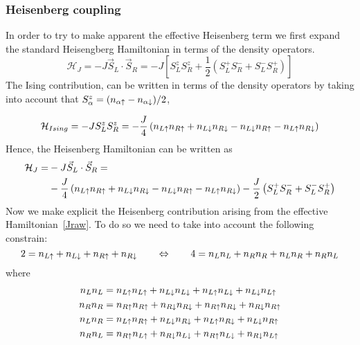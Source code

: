 \subsubsection{Heisenberg coupling}
In order to try to make apparent the effective Heisenberg term we first expand the standard Heisengberg Hamiltonian in terms of the density operators.
\begin{equation}
  \mathcal{H}_J = -J\vec{S}_L\cdot\vec{S}_R =
  -J \left[S^z_LS^z_R+\frac{1}{2}\left(S^+_LS^-_R+S^-_LS^+_R\right)\right]
\end{equation}
The Ising contribution, can be written in terms of the density operators by taking into account that $S^z_\alpha = (n_{\alpha\uparrow}-n_{\alpha\downarrow})/2$,

\begin{equation}
  \mathcal{H}_{Ising} = -J S^z_LS^z_R = -\frac{J}{4}
      \left(n_{L\uparrow}n_{R\uparrow}+n_{L\downarrow}n_{R\downarrow}-
            n_{L\downarrow}n_{R\uparrow}-n_{L\uparrow}n_{R\downarrow}\right)
\label{Ising_goal}
\end{equation}
Hence, the Heisenberg Hamiltonian can be written as
\begin{equation}
   \begin{split}
      \mathcal{H}_J =& -J\vec{S}_L\cdot\vec{S}_R =\\
                     &-\frac{J}{4}\left(n_{L\uparrow}n_{R\uparrow}+n_{L\downarrow}n_{R\downarrow}-
                    n_{L\downarrow}n_{R\uparrow}-n_{L\uparrow}n_{R\downarrow}\right)
  -\frac{J}{2}\left(S^+_LS^-_R+S^-_LS^+_R\right)
  \end{split}
\label{heisenberg_goal}
\end{equation}
Now we make explicit the Heisenberg contribution arising from the effective Hamiltonian~\eqref{Jraw}. To do so we need to take into account the following constrain:
\begin{equation}
  2 = n_{L\uparrow} + n_{L\downarrow} + n_{R\uparrow} + n_{R\downarrow} \quad\quad\Leftrightarrow \quad\quad
  4 = n_Ln_L + n_Rn_R + n_Ln_R + n_Rn_L
\label{constrain}
\end{equation}
where
\begin{equation}
  \begin{split}
    n_Ln_L &= n_{L\uparrow}n_{L\uparrow} + n_{L\downarrow}n_{L\downarrow} +
              n_{L\uparrow}n_{L\downarrow} + n_{L\downarrow}n_{L\uparrow}\\
    n_Rn_R &= n_{R\uparrow}n_{R\uparrow} + n_{R\downarrow}n_{R\downarrow} +
              n_{R\uparrow}n_{R\downarrow} + n_{R\downarrow}n_{R\uparrow}\\
    n_Ln_R &= n_{L\uparrow}n_{R\uparrow} + n_{L\downarrow}n_{R\downarrow} +
              n_{L\uparrow}n_{R\downarrow} + n_{L\downarrow}n_{R\uparrow}\\
    n_Rn_L &= n_{R\uparrow}n_{L\uparrow} + n_{R\downarrow}n_{L\downarrow} +
              n_{R\uparrow}n_{L\downarrow} + n_{R\downarrow}n_{L\uparrow}
  \end{split}
\label{rename_nl_nr}
\end{equation}
